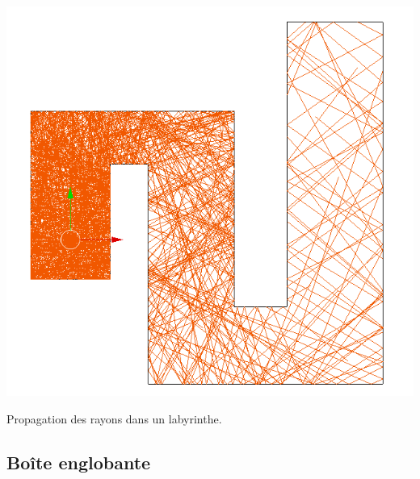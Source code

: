 \begin{figureth}
		\includegraphics[width=0.5\linewidth]{images/test0}
		\caption{Propagation des rayons dans un labyrinthe.}
		\label{test0}
\end{figureth}		

\subsection{Boîte englobante}


